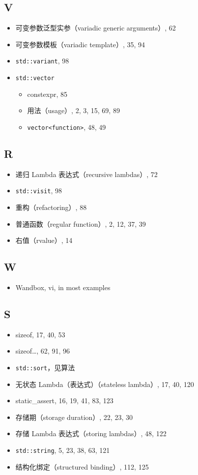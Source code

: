 \subsection{V}

\begin{itemize}
\item 可变参数泛型实参（variadic generic arguments）, 62
\item 可变参数模板（variadic template）, 35, 94
\item \texttt{std::variant}, 98
\item \texttt{std::vector}
  \begin{itemize}
  \item constexpr, 85
  \item 用法（usage）, 2, 3, 15, 69, 89
  \item \texttt{vector<function>}, 48, 49
  \end{itemize}
\end{itemize}

\subsection{R}

\begin{itemize}
\item 递归 Lambda 表达式（recursive lambdas）, 72
\item \texttt{std::visit}, 98
\item 重构（refactoring）, 88
\item 普通函数（regular function）, 2, 12, 37, 39
\item 右值（rvalue）, 14
\end{itemize}

\subsection{W}

\begin{itemize}
\item Wandbox, vi, in most examples
\end{itemize}

\subsection{S}

\begin{itemize}
\item sizeof, 17, 40, 53
\item sizeof…, 62, 91, 96
\item \texttt{std::sort}，见算法
\item 无状态 Lambda（表达式）（stateless lambda）, 17, 40, 120
\item static\_assert, 16, 19, 41, 83, 123
\item 存储期（storage duration）, 22, 23, 30
\item 存储 Lambda 表达式（storing lambdas）, 48, 122
\item \texttt{std::string}, 5, 23, 38, 63, 121
\item 结构化绑定（structured binding）, 112, 125
\end{itemize}

